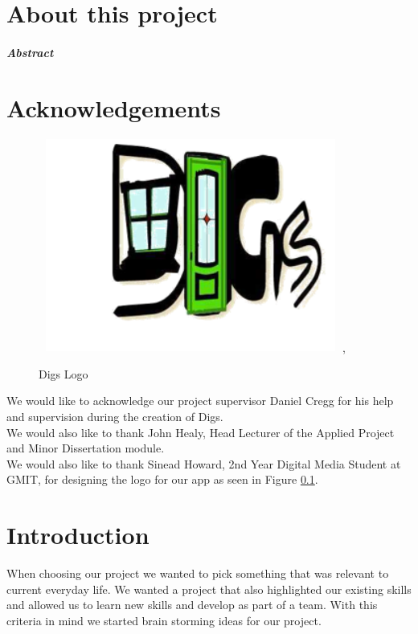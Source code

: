 
\chapter*{About this project}

\paragraph{Abstract}


\chapter*{\centering Acknowledgements}

\begin{figure}[h]
\centering
\includegraphics[width=10cm, height=7cm]{img/digs.png},
\caption{Digs Logo}
\label{digs_logo}
\end{figure}


\noindent We would like to acknowledge our project supervisor Daniel Cregg for his help and supervision during the creation of Digs.\\

\noindent We would also like to thank John Healy, Head Lecturer of the Applied Project and Minor Dissertation module. \\

\noindent We would also like to thank Sinead Howard, 2nd Year Digital Media Student at GMIT, for designing the logo for our app as seen in Figure \ref{digs_logo}.


\chapter{Introduction}

When choosing our project we wanted to pick something that was relevant to current everyday life. We wanted a project that also highlighted our existing skills and allowed us to learn new skills and develop as part of a team. With this criteria in mind we started brain storming ideas for our project.

